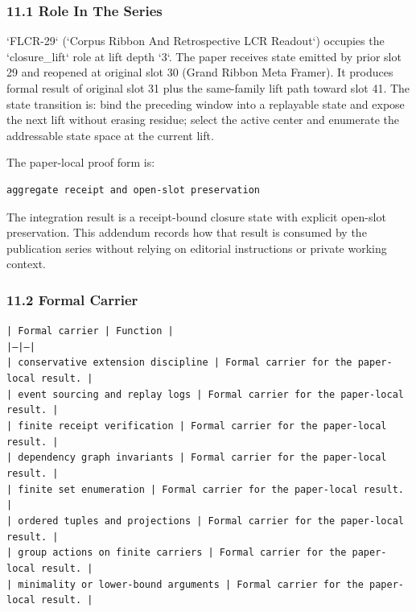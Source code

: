 \documentclass[11pt]{article}
\begin{document}
\subsubsection*{11.1 Role In The Series}

`FLCR-29` (`Corpus Ribbon And Retrospective LCR Readout`) occupies the `closure\_lift` role at lift depth `3`.
The paper receives state emitted by prior slot 29 and reopened at original slot 30 (Grand Ribbon Meta Framer). It produces formal result of original slot 31 plus the same-family lift path toward slot 41. The state transition is:
bind the preceding window into a replayable state and expose the next lift without erasing residue; select the active center and enumerate the addressable state space at the current lift.

The paper-local proof form is:

\begin{verbatim}
aggregate receipt and open-slot preservation
\end{verbatim}

The integration result is a receipt-bound closure state with explicit open-slot preservation. This addendum records how that result is
consumed by the publication series without relying on editorial instructions or
private working context.

\subsubsection*{11.2 Formal Carrier}

\noindent\texttt{| Formal carrier | Function |}\\
\noindent\texttt{|---|---|}\\
\noindent\texttt{| conservative extension discipline | Formal carrier for the paper-local result. |}\\
\noindent\texttt{| event sourcing and replay logs | Formal carrier for the paper-local result. |}\\
\noindent\texttt{| finite receipt verification | Formal carrier for the paper-local result. |}\\
\noindent\texttt{| dependency graph invariants | Formal carrier for the paper-local result. |}\\
\noindent\texttt{| finite set enumeration | Formal carrier for the paper-local result. |}\\
\noindent\texttt{| ordered tuples and projections | Formal carrier for the paper-local result. |}\\
\noindent\texttt{| group actions on finite carriers | Formal carrier for the paper-local result. |}\\
\noindent\texttt{| minimality or lower-bound arguments | Formal carrier for the paper-local result. |}\\
\end{document}
